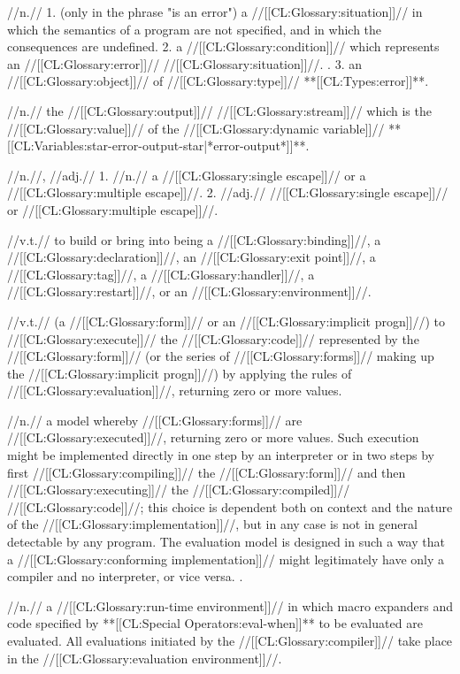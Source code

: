  //n.// 1. (only in the phrase "is an error") a //[[CL:Glossary:situation]]// in which the semantics of a program are not specified, and in which the consequences are undefined. 2. a //[[CL:Glossary:condition]]// which represents an //[[CL:Glossary:error]]// //[[CL:Glossary:situation]]//. \Seesection\ErrorTerms. 3. an //[[CL:Glossary:object]]// of //[[CL:Glossary:type]]// **[[CL:Types:error]]**.

 //n.// the //[[CL:Glossary:output]]// //[[CL:Glossary:stream]]// which is the //[[CL:Glossary:value]]// of the //[[CL:Glossary:dynamic variable]]// **[[CL:Variables:star-error-output-star|*error-output*]]**.

 //n.//, //adj.// 1. //n.// a //[[CL:Glossary:single escape]]// or a //[[CL:Glossary:multiple escape]]//. 2. //adj.// //[[CL:Glossary:single escape]]// or //[[CL:Glossary:multiple escape]]//.

 //v.t.// to build or bring into being a //[[CL:Glossary:binding]]//, a //[[CL:Glossary:declaration]]//, an //[[CL:Glossary:exit point]]//, a //[[CL:Glossary:tag]]//, a //[[CL:Glossary:handler]]//, a //[[CL:Glossary:restart]]//, or an //[[CL:Glossary:environment]]//. 


 //v.t.// (a //[[CL:Glossary:form]]// or an //[[CL:Glossary:implicit progn]]//) to //[[CL:Glossary:execute]]// the //[[CL:Glossary:code]]// represented by the //[[CL:Glossary:form]]// (or the series of //[[CL:Glossary:forms]]// making up the //[[CL:Glossary:implicit progn]]//) by applying the rules of //[[CL:Glossary:evaluation]]//, returning zero or more values.

 //n.// a model whereby //[[CL:Glossary:forms]]// are //[[CL:Glossary:executed]]//, returning zero or more values. Such execution might be implemented directly in one step by an interpreter or in two steps by first //[[CL:Glossary:compiling]]// the //[[CL:Glossary:form]]// and then //[[CL:Glossary:executing]]// the //[[CL:Glossary:compiled]]// //[[CL:Glossary:code]]//; this choice is dependent both on context and the nature of the //[[CL:Glossary:implementation]]//, but in any case is not in general detectable by any program. The evaluation model is designed in such a way that a //[[CL:Glossary:conforming implementation]]// might legitimately have only a compiler and no interpreter, or vice versa. \Seesection\EvaluationModel.
 
 //n.// a //[[CL:Glossary:run-time environment]]// in which macro expanders and code specified by **[[CL:Special Operators:eval-when]]** to be evaluated are evaluated. All evaluations initiated by the //[[CL:Glossary:compiler]]// take place in the //[[CL:Glossary:evaluation environment]]//.

